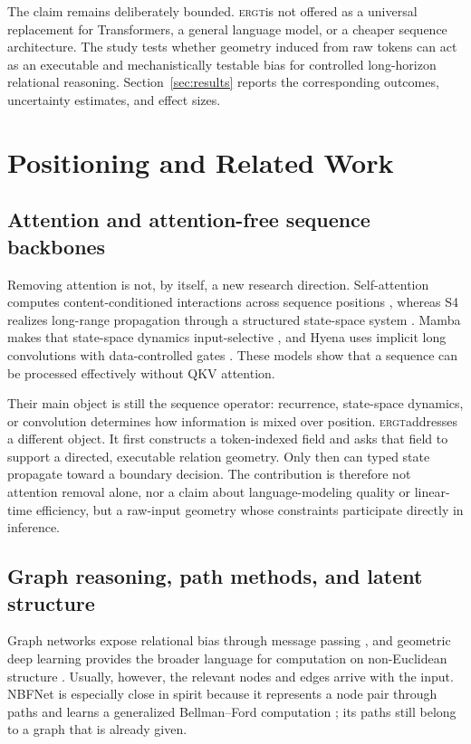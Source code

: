 \documentclass[11pt]{article}
\newcommand{\ERGT}{\textsc{ergt}}
\begin{document}
The claim remains deliberately bounded. \ERGT is not offered as a universal
replacement for Transformers, a general language model, or a cheaper sequence
architecture. The study tests whether geometry induced from raw tokens can act
as an executable and mechanistically testable bias for controlled long-horizon
relational reasoning. Section~\ref{sec:results} reports the corresponding
outcomes, uncertainty estimates, and effect sizes.

\section{Positioning and Related Work}
\label{sec:positioning}

\subsection{Attention and attention-free sequence backbones}

Removing attention is not, by itself, a new research direction. Self-attention
computes content-conditioned interactions across sequence positions
\cite{vaswani2017attention}, whereas S4 realizes long-range propagation through
a structured state-space system \cite{gu2022s4}. Mamba makes that state-space
dynamics input-selective \cite{gu2023mamba}, and Hyena uses implicit long
convolutions with data-controlled gates \cite{poli2023hyena}. These models show
that a sequence can be processed effectively without QKV attention.

Their main object is still the sequence operator: recurrence, state-space
dynamics, or convolution determines how information is mixed over position.
\ERGT addresses a different object. It first constructs a token-indexed field
and asks that field to support a directed, executable relation geometry. Only
then can typed state propagate toward a boundary decision. The contribution is
therefore not attention removal alone, nor a claim about language-modeling
quality or linear-time efficiency, but a raw-input geometry whose constraints
participate directly in inference.

\subsection{Graph reasoning, path methods, and latent structure}

Graph networks expose relational bias through message passing
\cite{battaglia2018relational,gilmer2017neural}, and geometric deep learning
provides the broader language for computation on non-Euclidean structure
\cite{bronstein2021geometric}. Usually, however, the relevant nodes and edges
arrive with the input. NBFNet is especially close in spirit because it
represents a node pair through paths and learns a generalized Bellman--Ford
computation \cite{zhu2021nbfnet}; its paths still belong to a graph that is
already given.
\end{document}
